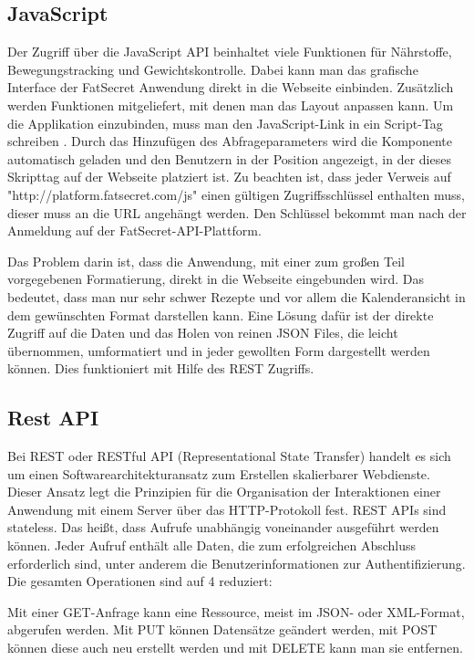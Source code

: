 \subsection{JavaScript}
Der Zugriff über die JavaScript API beinhaltet viele Funktionen für Nährstoffe, Bewegungstracking und Gewichtskontrolle. Dabei kann man das grafische Interface der FatSecret Anwendung direkt in die Webseite einbinden. Zusätzlich werden Funktionen mitgeliefert, mit denen man das Layout anpassen kann. Um die Applikation einzubinden, muss man den JavaScript-Link in ein Script-Tag schreiben . Durch das Hinzufügen des Abfrageparameters  wird die Komponente automatisch geladen und den Benutzern in der Position angezeigt, in der dieses Skripttag auf der Webseite platziert ist. Zu beachten ist, dass jeder Verweis auf "http://platform.fatsecret.com/js" einen gültigen Zugriffsschlüssel enthalten muss, dieser muss an die URL angehängt werden. Den Schlüssel bekommt man nach der Anmeldung auf der FatSecret-API-Plattform.  

Das Problem darin ist, dass die Anwendung, mit einer zum großen Teil vorgegebenen Formatierung, direkt in die Webseite eingebunden wird. Das bedeutet, dass man nur sehr schwer Rezepte und vor allem die Kalenderansicht in dem gewünschten Format darstellen kann. Eine Lösung dafür ist der direkte Zugriff auf die Daten und das Holen von reinen JSON Files, die leicht übernommen, umformatiert und in jeder gewollten Form dargestellt werden können. Dies funktioniert mit Hilfe des REST Zugriffs.
\subsection{Rest API}
Bei REST oder RESTful API (Representational State Transfer)  \cite{restapidef}  handelt es sich um einen Softwarearchitekturansatz zum Erstellen skalierbarer Webdienste. Dieser Ansatz legt die Prinzipien für die Organisation der Interaktionen einer Anwendung mit einem Server über das HTTP-Protokoll fest. REST APIs sind stateless. Das heißt, dass Aufrufe unabhängig voneinander ausgeführt werden können. Jeder Aufruf enthält alle Daten, die zum erfolgreichen Abschluss erforderlich sind, unter anderem die Benutzerinformationen zur Authentifizierung. 
Die gesamten Operationen sind auf 4 reduziert: 

Mit einer GET-Anfrage kann eine Ressource, meist im JSON- oder XML-Format, abgerufen werden. Mit PUT können Datensätze geändert werden, mit POST können diese auch neu erstellt werden und mit DELETE kann man sie entfernen. 

